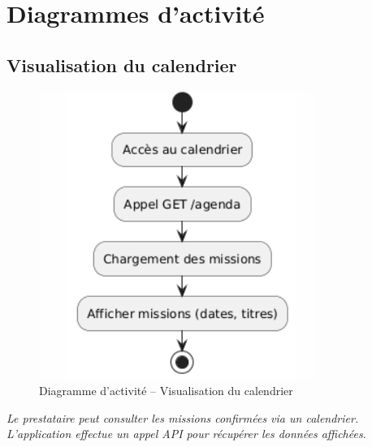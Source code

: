 \section{Diagrammes d’activité}

\subsection*{Visualisation du calendrier}
\begin{figure}[H]
\centering
\includegraphics[width=0.60\linewidth]{figures/Visualisation du calendrier des missions.png}
\caption{Diagramme d’activité – Visualisation du calendrier}
\end{figure}
\textit{Le prestataire peut consulter les missions confirmées via un calendrier. L’application effectue un appel API pour récupérer les données affichées.}

